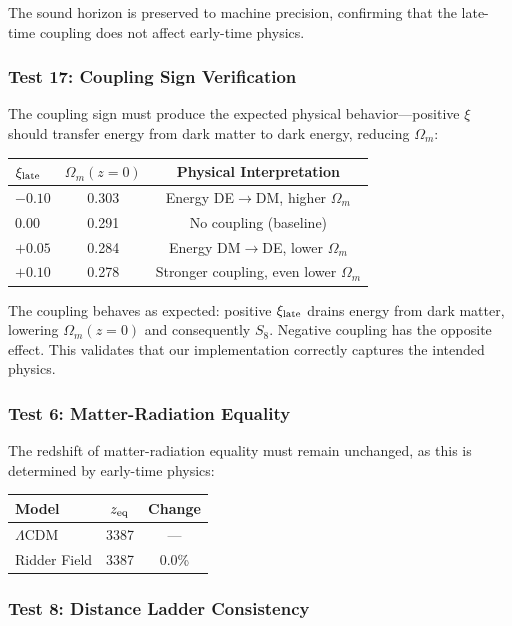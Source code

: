 \documentclass[twocolumn,showpacs,preprintnumbers,amsmath,amssymb,prd]{revtex4-2}
\begin{document}
The sound horizon is preserved to machine precision, confirming that the late-time coupling does not affect early-time physics.

\subsubsection{Test 17: Coupling Sign Verification}

The coupling sign must produce the expected physical behavior---positive $\xi$ should transfer energy from dark matter to dark energy, reducing $\Omega_m$:
\begin{center}
\begin{tabular}{lcc}
\toprule
$\xi_{\rm late}$ & $\Omega_m(z=0)$ & Physical Interpretation \\
\midrule
$-0.10$ & 0.303 & Energy DE$\to$DM, higher $\Omega_m$ \\
$0.00$ & 0.291 & No coupling (baseline) \\
$+0.05$ & 0.284 & Energy DM$\to$DE, lower $\Omega_m$ \\
$+0.10$ & 0.278 & Stronger coupling, even lower $\Omega_m$ \\
\bottomrule
\end{tabular}
\end{center}

The coupling behaves as expected: positive $\xi_{\rm late}$ drains energy from dark matter, lowering $\Omega_m(z=0)$ and consequently $S_8$. Negative coupling has the opposite effect. This validates that our implementation correctly captures the intended physics.

\subsubsection{Test 6: Matter-Radiation Equality}

The redshift of matter-radiation equality must remain unchanged, as this is determined by early-time physics:
\begin{center}
\begin{tabular}{lcc}
\toprule
Model & $z_{\rm eq}$ & Change \\
\midrule
$\Lambda$CDM & 3387 & --- \\
Ridder Field & 3387 & 0.0\% \\
\bottomrule
\end{tabular}
\end{center}

\subsubsection{Test 8: Distance Ladder Consistency}
\end{document}
